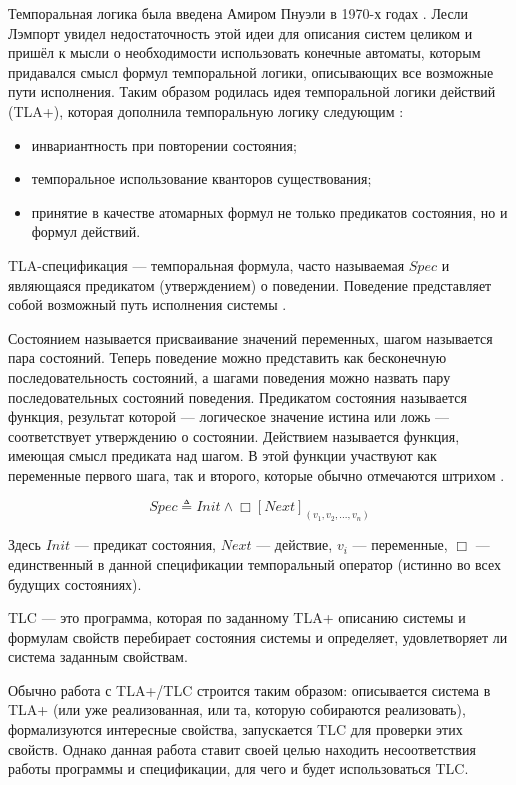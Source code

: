 Темпоральная логика была введена Амиром Пнуэли в 1970-х годах \cite{amir70}.
Лесли Лэмпорт увидел недостаточность этой идеи для описания систем целиком и
пришёл к мысли о необходимости использовать конечные автоматы, которым
придавался смысл формул темпоральной логики, описывающих все возможные
пути исполнения. Таким образом родилась идея темпоральной логики действий
(TLA+), которая дополнила темпоральную логику следующим \cite{lamport08}:

\begin{itemize}
    \item инвариантность при повторении состояния;
    \item темпоральное использование кванторов существования;
    \item принятие в качестве атомарных формул не только предикатов состояния,
        но и формул действий.
\end{itemize}

TLA-спецификация — темпоральная формула, часто называемая $Spec$ и являющаяся
предикатом (утверждением) о поведении. Поведение представляет собой возможный
путь исполнения системы \cite{habrias06}.

Состоянием называется присваивание значений переменных, шагом называется пара
состояний. Теперь поведение можно представить как бесконечную последовательность
состояний, а шагами поведения можно назвать пару последовательных состояний
поведения. Предикатом состояния называется функция, результат которой —
логическое значение истина или ложь — соответствует утверждению о состоянии.
Действием называется функция, имеющая смысл предиката над шагом. В этой функции
участвуют как переменные первого шага, так и второго, которые обычно
отмечаются штрихом \cite{habrias06}.

$$
Spec \triangleq Init \wedge \Box [Next]_{(v_1, v_2, ..., v_n)}
$$

Здесь $Init$ — предикат состояния, $Next$ — действие, $v_i$ — переменные, $\Box$
— единственный в данной спецификации темпоральный оператор (истинно во всех
будущих состояниях).

TLC — это программа, которая по заданному TLA+ описанию системы и формулам
свойств перебирает состояния системы и определяет, удовлетворяет ли система
заданным свойствам.

Обычно работа с TLA+/TLC строится таким образом: описывается система в TLA+
(или уже реализованная, или та, которую собираются реализовать), формализуются
интересные свойства, запускается TLC для проверки этих свойств. Однако данная
работа ставит своей целью находить несоответствия работы программы и
спецификации, для чего и будет использоваться TLC.

